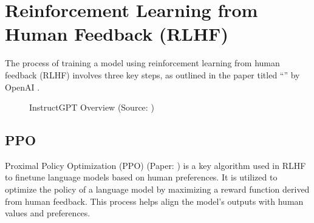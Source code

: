 \documentclass[letterpaper,11pt,english]{sphinxmanual}
\begin{document}
\sphinxstepscope


\chapter{Reinforcement Learning from Human Feedback (RLHF)}
\label{\detokenize{rlhf:reinforcement-learning-from-human-feedback-rlhf}}\label{\detokenize{rlhf:rlhf}}\label{\detokenize{rlhf::doc}}
\sphinxAtStartPar
The process of training a model using reinforcement learning from human
feedback (RLHF) involves three key steps, as outlined in the paper
titled “” by OpenAI .

\begin{figure}[htbp]
\centering
\capstart

\noindent{}
\caption{InstructGPT Overview (Source: )}\label{\detokenize{rlhf:id6}}\end{figure}


\section{PPO}
\label{\detokenize{rlhf:ppo}}
\sphinxAtStartPar
Proximal Policy Optimization (PPO) (Paper: ) is a key algorithm
used in RLHF to fine\sphinxhyphen{}tune language models based on human preferences. It
is utilized to optimize the policy of a language model by maximizing a
reward function derived from human feedback. This process helps align
the model’s outputs with human values and preferences. 
\end{document}
